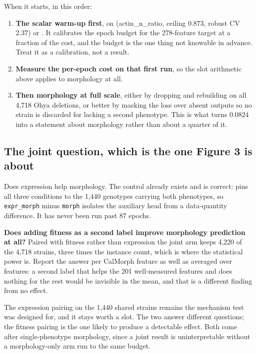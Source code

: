 When it starts, in this order:

\begin{enumerate}
\item \textbf{The scalar warm-up first}, on  (actin\_n\_ratio, ceiling $0.873$,
  robust CV $2.37$) or . It calibrates the epoch budget for the 278-feature
  target at a fraction of the cost, and the budget is the one thing not knowable in advance.
  Treat it as a calibration, not a result.
\item \textbf{Measure the per-epoch cost on that first run}, so the slot arithmetic above
  applies to morphology at all.
\item \textbf{Then morphology at full scale}, either by dropping 
  and rebuilding on all 4,718 Ohya deletions, or better by masking the loss over absent
  outputs so no strain is discarded for lacking a second phenotype. This is what turns
  $0.0824$ into a statement about morphology rather than about a quarter of it.
\end{enumerate}

\subsection{The joint question, which is the one Figure 3 is about}

Does expression help morphology. The control already exists and is correct:
 pins all three conditions to the 1,440 genotypes
carrying both phenotypes, so \texttt{expr\_morph} minus \texttt{morph} isolates the
auxiliary head from a data-quantity difference. It has never been run past 87 epochs.

 \textbf{Does
adding fitness as a second label improve morphology prediction at all?} Paired with fitness
rather than expression the joint arm keeps 4,220 of the 4,718 strains, three times the
instance count, which is where the statistical power is. Report the answer per CalMorph
feature as well as averaged over features: a second label that helps the 201 well-measured
features and does nothing for the rest would be invisible in the mean, and that is a
different finding from no effect.

The expression pairing on the 1,440 shared strains remains the mechanism test
 was designed for, and it stays worth a slot. The two
answer different questions; the fitness pairing is the one likely to produce a detectable
effect. Both come after single-phenotype morphology, since a joint result is
uninterpretable without a morphology-only arm run to the same budget.

